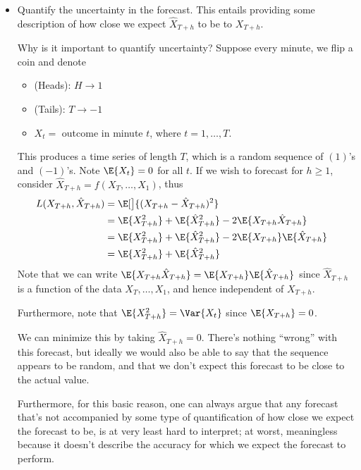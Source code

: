 \begin{itemize}
    \item Quantify the uncertainty in the forecast.
          This entails providing some description of how close
          we expect $ \hat{X}_{T+h} $ to be to $ X_{T+h} $.
          \begin{Example}{Why is it important to quantify uncertainty?}{}
              Suppose every minute, we flip a coin and denote
              \begin{itemize}
                  \item (Heads): $ H\to 1 $
                  \item (Tails): $ T\to -1 $
                  \item $ X_t= $ outcome in minute $ t $,
                        where $ t=1,\ldots,T $.
              \end{itemize}
              This produces a time series of length $ T $, which is a random
              sequence of $ (1) $'s and $ (-1) $'s. Note $ \E{X_t}=0 $ for all
              $ t $.
              If we wish to forecast for $ h\ge 1 $,
              consider $ \hat{X}_{T+h}=f(X_T,\ldots,X_1) $, thus
              \begin{align*}
                  L(X_{T+h},\hat{X}_{T+h})
                   & =\E[\big]{(X_{T+h}-\hat{X}_{T+h})^2}                               \\
                   & =\E{X_{T+h}^2}+\E{\hat{X}_{T+h}^2}-2\E{X_{T+h}\hat{X}_{T+h}}       \\
                   & =\E{X_{T+h}^2}+\E{\hat{X}_{T+h}^2}-2\E{X_{T+h}}\E{\hat{X}_{T+h}} & \\
                   & =\E{X_{T+h}^2}+\E{\hat{X}_{T+h}^2}                                 \\
              \end{align*}
              Note that we can write $ \E{X_{T+h}\hat{X}_{T+h}}=\E{X_{T+h}}\E{\hat{X}_{T+h}} $ since
              $ \hat{X}_{T+h} $ is a function of the data
              $ X_T,\ldots,X_1 $, and hence independent of $ X_{T+h} $.

              Furthermore, note that
              $ \E{X_{T+h}^2}=\Var{X_t} $ since $ \E{X_{T+h}}=0 $.



              We can minimize this by taking $ \hat{X}_{T+h}=0 $. There's
              nothing ``wrong'' with this forecast, but ideally
              we would also be able to say that the sequence appears to be random,
              and that we don't expect this forecast to be close to the actual value.

                  {\color{blue}Furthermore, for this basic reason, one can always
                      argue that any forecast that's not accompanied by some
                      type of quantification of how close we expect the forecast to be,
                      is at very least hard to interpret; at worst, meaningless
                      because it doesn't
                      describe the accuracy for which we expect the forecast to perform.}
          \end{Example}
\end{itemize}
